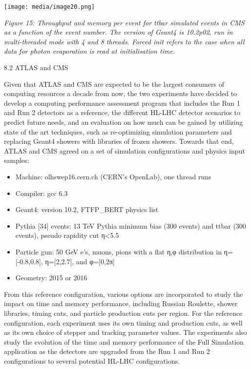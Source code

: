 \documentclass[12pt,a4paper]{article}
\begin{document}
\texttt{[image: media/image20.png]}

\emph{Figure 15: Throughput and memory per event for ttbar simulated
events in CMS as a function of the event number. The version of Geant4
is 10.2p02, run in multi-threaded mode with 4 and 8 threads. Forced init
refers to the case when all data for photon evaporation is read at
initialisation time.}

8.2 ATLAS and CMS

Given that ATLAS and CMS are expected to be the largest consumers of
computing resources a decade from now, the two experiments have decided
to develop a computing performance assessment program that includes the
Run 1 and Run 2 detectors as a reference, the different HL-LHC detector
scenarios to predict future needs, and an evaluation on how much can be
gained by utilizing state of the art techniques, such as re-optimizing
simulation parameters and replacing Geant4 showers with libraries of
frozen showers. Towards that end, ATLAS and CMS agreed on a set of
simulation configurations and physics input samples:

\begin{itemize}
\item
  Machine: olhswep16.cern.ch (CERN's OpenLab), one thread runs
\end{itemize}

\begin{itemize}
\item
  Compiler: gcc 6.3
\item
  Geant4: version 10.2, FTFP\_BERT physics list
\item
  Pythia {[}34{]} events: 13 TeV Pythia minimum bias (300 events) and
  ttbar (300 events), pseudo rapidity cut
  \textbar{}η\textbar{}\textless{}5.5
\item
  Particle gun: 50 GeV e's, muons, pions with a flat η,φ distribution in
  η={[}-0.8,0.8{]}, η={[}2,2.7{]}, and φ={[}0,2π{]}
\item
  Geometry: 2015 or 2016
\end{itemize}

From this reference configuration, various options are incorporated to
study the impact on time and memory performance, including Russian
Roulette, shower libraries, timing cuts, and particle production cuts
per region. For the reference configuration, each experiment uses its
own timing and production cuts, as well as its own choice of stepper and
tracking parameter values. The experiments also study the evolution of
the time and memory performance of the Full Simulation application as
the detectors are upgraded from the Run 1 and Run 2 configurations to
several potential HL-LHC configurations.
\end{document}
